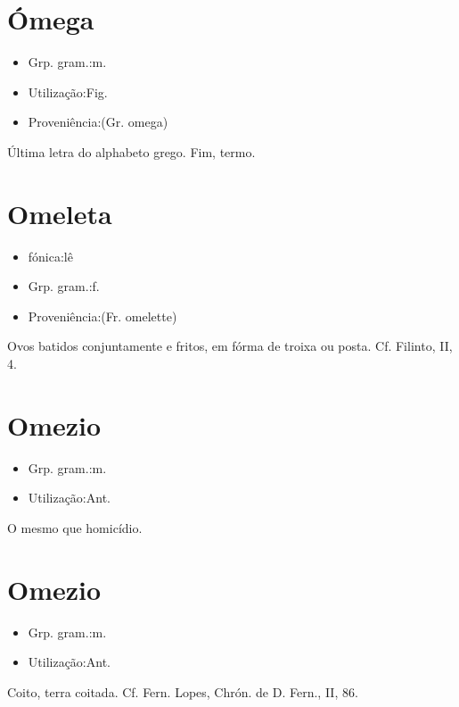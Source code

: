 \section{Ómega}
\begin{itemize}
\item {Grp. gram.:m.}
\end{itemize}
\begin{itemize}
\item {Utilização:Fig.}
\end{itemize}
\begin{itemize}
\item {Proveniência:(Gr. \textunderscore omega\textunderscore )}
\end{itemize}
Última letra do alphabeto grego.
Fim, termo.
\section{Omeleta}
\begin{itemize}
\item {fónica:lê}
\end{itemize}
\begin{itemize}
\item {Grp. gram.:f.}
\end{itemize}
\begin{itemize}
\item {Proveniência:(Fr. \textunderscore omelette\textunderscore )}
\end{itemize}
Ovos batidos conjuntamente e fritos, em fórma de troixa ou posta. Cf. Filinto, II, 4.
\section{Omezio}
\begin{itemize}
\item {Grp. gram.:m.}
\end{itemize}
\begin{itemize}
\item {Utilização:Ant.}
\end{itemize}
O mesmo que \textunderscore homicídio\textunderscore .
\section{Omezio}
\begin{itemize}
\item {Grp. gram.:m.}
\end{itemize}
\begin{itemize}
\item {Utilização:Ant.}
\end{itemize}
Coito, terra coitada. Cf. Fern. Lopes, \textunderscore Chrón. de D. Fern.\textunderscore , II, 86.
